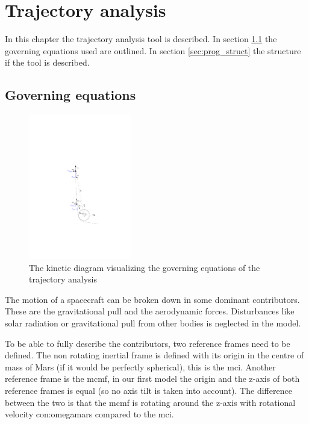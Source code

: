 \section{Trajectory analysis} \label{ch:trajectory}

In this chapter the trajectory analysis tool is described. In section \ref{sec:gov} the governing equations used are outlined. In section \ref{sec:prog_struct} the structure if the tool is described.

\subsection{Governing equations}\label{sec:gov}

\begin{figure}
		\centering
		\includegraphics[width = 0.4\textwidth]{Figure/orbital_mechanics.pdf}
		\caption{The kinetic diagram visualizing the governing equations of the trajectory analysis}
		\label{fig:orb}
\end{figure}

The motion of a spacecraft can be broken down in some dominant contributors. These are the gravitational pull and the aerodynamic forces. Disturbances like solar radiation or gravitational pull from other bodies is neglected in the model.

To be able to fully describe the contributors, two reference frames need to be defined. The non rotating inertial frame is defined with its origin in the centre of mass of Mars (if it would be perfectly spherical), this is the \gls{mci}. 
Another reference frame is the \gls{mcmf}, in our first model the origin and the z-axis of both reference frames is equal (so no axis tilt is taken into account). The difference between the two is that the \gls{mcmf} is rotating around the z-axis with rotational velocity \gls{con:omegamars} compared to the \gls{mci}.

